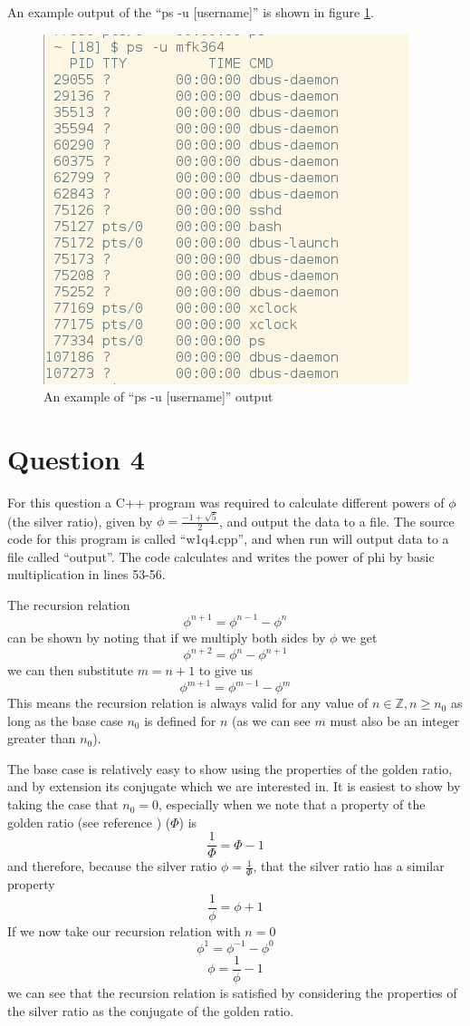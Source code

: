 \documentclass[a4paper,12pt]{UoBnote}
\begin{document}
\begin{enumerate}[label=\alph*)]
		An example output of the ``ps -u [username]'' is shown in figure \ref{fig:ps}. 
		\begin{figure}
			\centering
			\includegraphics[scale=0.4]{ps}
			\caption{An example of ``ps -u [username]'' output}
			\label{fig:ps}
		\end{figure}

\end{enumerate}

\section{Question 4}


For this question a C++ program was required to calculate different powers of $\phi$ (the silver ratio), given by $\phi = \frac{-1 + \sqrt{5}}{2}$, and output the data to a file. The source code for this program is called ``w1q4.cpp'', and when run will output data to a file called ``output''. The code calculates and writes the power of phi by basic multiplication in lines 53-56.

The recursion relation \[\phi^{n+1}=\phi^{n-1}-\phi^{n}\] can be shown by noting that if we multiply both sides by $\phi$ we get \[\phi^{n+2}=\phi^{n}-\phi^{n+1}\] we can then substitute $m=n+1$ to give us \[\phi^{m+1}=\phi^{m-1}-\phi^{m}\] This means the recursion relation is always valid for any value of $n\in\mathbb{Z}, n\geq n_0$ as long as the base case $n_0$ is defined for $n$ (as we can see $m$ must also be an integer greater than $n_0$).

The base case is relatively easy to show using the properties of the golden ratio, and by extension its conjugate which we are interested in. It is easiest to show by taking the case that $n_0=0$, especially when we note that a property of the golden ratio (see reference \cite{goldenratio}) ($\Phi$) is \[\frac{1}{\Phi}=\Phi-1\] and therefore, because the silver ratio $\phi=\frac{1}{\Phi}$, that the silver ratio has a similar property \[\frac{1}{\phi}=\phi+1\] If we now take our recursion relation with $n=0$ \[\phi^1=\phi^{-1}-\phi^0\] \[\phi=\frac{1}{\phi}-1\] we can see that the recursion relation is satisfied by considering the properties of the silver ratio as the conjugate of the golden ratio.
\end{document}
